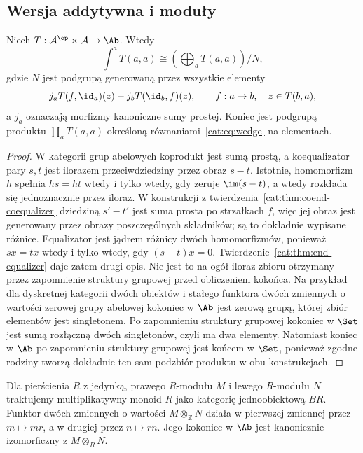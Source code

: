 \subsection{Wersja addytywna i moduły}
\begin{twierdzenie}\label{cat:thm:additive-coend}
Niech $T:\mathcal A^{\op}\times\mathcal A\to\Ab$. Wtedy
\[
 \int^a T(a,a)\cong
 \left(\bigoplus_a T(a,a)\right)/N,
\]
gdzie $N$ jest podgrupą generowaną przez wszystkie elementy
\[
 j_a T(f,\id_a)(z)-j_b T(\id_b,f)(z),
 \qquad f:a\to b,\quad z\in T(b,a),
\]
a $j_a$ oznaczają morfizmy kanoniczne sumy prostej. Koniec jest podgrupą produktu $\prod_a T(a,a)$ określoną równaniami~\eqref{cat:eq:wedge} na elementach.
\end{twierdzenie}
\begin{proof}
W kategorii grup abelowych koprodukt jest sumą prostą, a koequalizator pary $s,t$ jest ilorazem przeciwdziedziny przez obraz $s-t$. Istotnie, homomorfizm $h$ spełnia $hs=ht$ wtedy i tylko wtedy, gdy zeruje $\im(s-t)$, a wtedy rozkłada się jednoznacznie przez iloraz. W konstrukcji z twierdzenia~\ref{cat:thm:coend-coequalizer} dziedziną $s'-t'$ jest suma prosta po strzałkach $f$, więc jej obraz jest generowany przez obrazy poszczególnych składników; są to dokładnie wypisane różnice. Equalizator jest jądrem różnicy dwóch homomorfizmów, ponieważ $sx=tx$ wtedy i tylko wtedy, gdy $(s-t)x=0$. Twierdzenie~\ref{cat:thm:end-equalizer} daje zatem drugi opis. Nie jest to na ogół iloraz zbioru otrzymany przez zapomnienie struktury grupowej przed obliczeniem kokońca. Na przykład dla dyskretnej kategorii dwóch obiektów i stałego funktora dwóch zmiennych o wartości zerowej grupy abelowej kokoniec w $\Ab$ jest zerową grupą, której zbiór elementów jest singletonem. Po zapomnieniu struktury grupowej kokoniec w $\Set$ jest sumą rozłączną dwóch singletonów, czyli ma dwa elementy. Natomiast koniec w $\Ab$ po zapomnieniu struktury grupowej jest końcem w $\Set$, ponieważ zgodne rodziny tworzą dokładnie ten sam podzbiór produktu w obu konstrukcjach.
\end{proof}
\begin{wniosek}\label{cat:cor:module-tensor-coend}
Dla pierścienia $R$ z jedynką, prawego $R$-modułu $M$ i lewego $R$-modułu $N$ traktujemy multiplikatywny monoid $R$ jako kategorię jednoobiektową $BR$. Funktor dwóch zmiennych o wartości $M\otimes_{\mathbb Z}N$ działa w pierwszej zmiennej przez $m\mapsto mr$, a w drugiej przez $n\mapsto rn$. Jego kokoniec w $\Ab$ jest kanonicznie izomorficzny z $M\otimes_R N$.
\end{wniosek}
